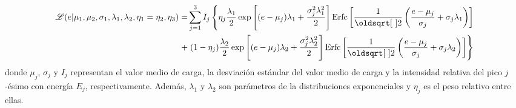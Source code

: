 {\small
\begin{align}
    \Lagr(e|\mu_{1},
            \mu_{2},
            \sigma_{1},
            \lambda_{1},
            \lambda_{2},
            \eta_{1} = \eta_{2},
            \eta_{3})
    = &
    \sum\limits_{j=1}^{3} I_{j}
    \left\{
        \eta_{j}\frac{\lambda_{1}}{2}
        \exp
            \left[
                (e-\mu_{j})\lambda_{1} + \frac{\sigma_{j}^{2}\lambda_{1}^{2}}{2}
            \right]
        \mbox{Erfc}
        \left[
            \frac{1}{\sqrt{2}}
            \left(
                \frac{e - \mu_{j}}{\sigma_{j}}
                +\sigma_{j}\lambda_{1}
            \right)
        \right] \right. \nonumber
        \\
        + &
        \left.
        (1-\eta_{j})\frac{\lambda_{2}}{2}
        \exp
            \left[
                 (e - \mu_{j})\lambda_{2}
                 + \frac{\sigma_{j}^{2}\lambda_{2}^{2}}{2}
            \right]
        \mbox{Erfc}
        \left[
            \frac{1}{\sqrt{2}}
            \left(
                \frac{e - \mu_{j}}{\sigma_{j}}
                +\sigma_{j}\lambda_{2}
            \right)
        \right]
    \right\}
        \label{ec:verosimilitud}
\end{align}
}
donde $\mu_{j}$, $\sigma_{j}$ y $I_{j}$ representan el valor medio de carga, la desviación estándar del valor medio de carga y la intensidad relativa del pico $j$-ésimo con energía $E_{j}$, respectivamente. Además, $\lambda_{1}$ y $\lambda_{2}$ son parámetros de la distribuciones exponenciales y $\eta_{j}$ es el peso relativo entre ellas.

